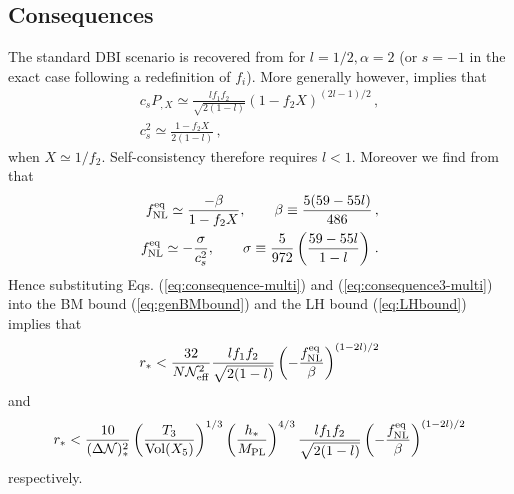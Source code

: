 \subsection{Consequences}
\label{sec:consequences-multi}

The standard DBI scenario is recovered from  for
$l=1/2, \alpha = 2$ (or $s=-1$ in the exact case following a redefinition of
$f_i$). 
More generally however,  implies that  
% 
\begin{eqnarray}
\label{eq:consequence-multi}
c_sP_{,X} \simeq \frac{l f_1 f_2}{\sqrt{2(1-l)}} \left( 
1- f_2X \right)^{(2l-1)/2} \,,
\\
c_s^2 \simeq \frac{1-f_2X}{2(1-l)} \,,
\end{eqnarray}
% 
when $X \simeq 1/f_2$. Self-consistency therefore
requires $l<1$. Moreover
we find from  that
%  
\begin{eqnarray}
\label{eq:consequence3-multi}
f_{\mathrm{NL}}^{\mathrm{eq}} \simeq \frac{-\beta}{1-f_2X} , \qquad \beta \equiv \frac{5(59-55l)}{486}
\,,
\\
\label{eq:consequence4-multi}
f_{\mathrm{NL}}^{\mathrm{eq}} \simeq -\frac{\sigma}{c_s^2}, \qquad \sigma \equiv 
\frac{5}{972} \left( \frac{59-55l}{1-l} \right) \,.
\end{eqnarray}
% 
Hence substituting Eqs. (\ref{eq:consequence-multi}) and (\ref{eq:consequence3-multi}) 
into the BM bound (\ref{eq:genBMbound}) and the LH bound (\ref{eq:LHbound})
implies that
%  
\begin{equation}
\label{eq:weakBM-multi}
r_*< \frac{32}{N \mathcal{N}_\mathrm{eff}^2} \frac{l f_1 f_2}{\sqrt{2(1-l)}}
\left( -\frac{f_{\mathrm{NL}}^{\mathrm{eq}}}{\beta} \right)^{(1-2l)/2}
\end{equation}
% 
and
%  
\begin{equation}
\label{eq:weakLH-multi}
r_* < \frac{10}{(\Delta \mathcal{N})_*^2} \left( \frac{T_3}{\mathrm{Vol} (X_5)} \right)^{1/3} 
\left( \frac{h_*}{M_{\mathrm{PL}}} \right)^{4/3}
\frac{l f_1 f_2}{\sqrt{2(1-l)}}
\left( -\frac{f_{\mathrm{NL}}^{\mathrm{eq}}}{\beta} \right)^{(1-2l)/2}
\end{equation}
% 
respectively. 


